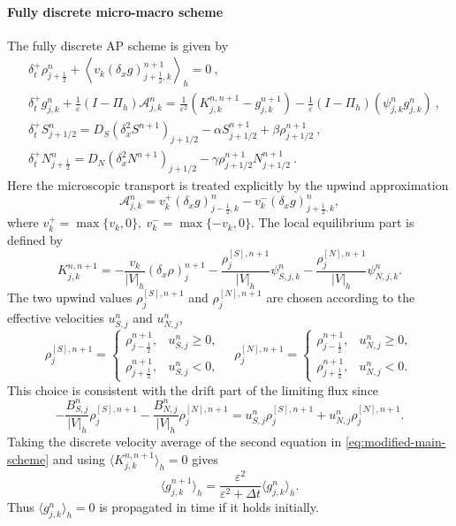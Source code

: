 \documentclass[11pt,twoside]{article}
\numberwithin{equation}{section}
\theoremstyle{plain}
\theoremstyle{nonumberplain}
\begin{document}
{{\paragraph{Fully discrete micro-macro scheme}
The fully discrete AP scheme is given by
\begin{subequations}\label{eq:modified-main-scheme}
\begin{align}
&
\delta_t^+\rho_{j+\frac12}^n
+
\left\langle
v_k(\delta_x g)_{j+\frac12,k}^{n+1}
\right\rangle_h
=0\ ,\label{eq:modified-main-scheme1}
\\[1mm]
&
\delta_t^+ g_{j,k}^n
+
\frac1\varepsilon
(I-\Pi_h)\mathcal A_{j,k}^n
=
\frac1{\varepsilon^2}
\left(
K_{j,k}^{n,n+1}
-
g_{j,k}^{n+1}
\right)
-
\frac1\varepsilon
(I-\Pi_h)(\psi_{j,k}^n g_{j,k}^n)\ ,\label{eq:modified-main-scheme2}
\\[1mm]
&
\delta_t^+ S_{j+1/2}^n
=
 D_S(\delta_x^2S^{n+1})_{j+1/2}
-\alpha S_{j+1/2}^{n+1}
+\beta\rho_{j+1/2}^{n+1}\ ,\label{eq:modified-main-scheme3}
\\[1mm]
&
\delta_t^+N_{j+\frac12}^{n}
=
 D_N(\delta_x^2N^{n+1})_{j+1/2}
-\gamma\rho_{j+1/2}^{n+1}N_{j+1/2}^{n+1}\ .\label{eq:modified-main-scheme4}
\end{align}
\end{subequations}
Here the microscopic transport is treated explicitly by the upwind
approximation
\[
\mathcal A_{j,k}^n
=
v_k^+(\delta_x g)_{j-\frac12,k}^{n}
-
v_k^-(\delta_x g)_{j+\frac12,k}^{n},
\]
where
$
v_k^+=\max\{v_k,0\},
\
v_k^-=\max\{-v_k,0\}.
$
The local equilibrium part is defined by
\begin{equation}\label{eq:modified-K-two-upwind}
K_{j,k}^{n,n+1}
=
-\frac{v_k}{|V|_h}(\delta_x\rho)_j^{n+1}
-
\frac{\rho_j^{[S],n+1}}{|V|_h}\psi_{S,j,k}^n
-
\frac{\rho_j^{[N],n+1}}{|V|_h}\psi_{N,j,k}^n .
\end{equation}
The two upwind values $\rho_j^{[S],n+1}$ and $\rho_j^{[N],n+1}$ are chosen according to the effective velocities
\(u_{S,j}^n\) and \(u_{N,j}^n\),
\begin{equation}\label{eq: upwind densities}
\rho_j^{[S],n+1}
=
\begin{cases}
\rho_{j-\frac12}^{n+1}, & u_{S,j}^n\ge 0,\\
\rho_{j+\frac12}^{n+1}, & u_{S,j}^n<0,
\end{cases}
\quad 
\rho_j^{[N],n+1}
=
\begin{cases}
\rho_{j-\frac12}^{n+1}, & u_{N,j}^n\ge 0,\\
\rho_{j+\frac12}^{n+1}, & u_{N,j}^n<0.
\end{cases}
\end{equation}
This choice is consistent with the drift part of the limiting flux since
\[
-\frac{B_{S,j}^n}{|V|_h}\rho_j^{[S],n+1}
-
\frac{B_{N,j}^n}{|V|_h}\rho_j^{[N],n+1}
=
u_{S,j}^n\rho_j^{[S],n+1}
+
u_{N,j}^n\rho_j^{[N],n+1}.
\]
Taking the
discrete velocity average of the second equation in
\eqref{eq:modified-main-scheme} and using
$
\langle K_{j,k}^{n,n+1}\rangle_h=0
$
gives
\[
\langle g_{j,k}^{n+1}\rangle_h
=
\frac{\varepsilon^2}{\varepsilon^2+\Delta t}
\langle g_{j,k}^{n}\rangle_h .
\]
Thus \(\langle g_{j,k}^{n}\rangle_h=0\) is propagated in time if it holds
initially.

}}
\end{document}
